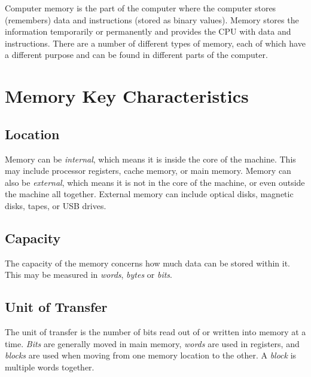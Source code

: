 
Computer memory is the part of the computer where the computer stores (remembers) data and instructions (stored as binary values). Memory stores the information temporarily or permanently and provides the CPU with data and instructions. There are a number of different types of memory, each of which have a different purpose and can be found in different parts of the computer.

\section*{Memory Key Characteristics}
\subsection*{Location}
Memory can be \textit{internal}, which means it is inside the core of the machine. This may include processor registers, cache memory, or main memory. Memory can also be \textit{external}, which means it is not in the core of the machine, or even outside the machine all together. External memory can include optical disks, magnetic disks, tapes, or USB drives.
\subsection*{Capacity}
The capacity of the memory concerns how much data can be stored within it. This may be measured in \textit{words}, \textit{bytes} or \textit{bits}.
\subsection*{Unit of Transfer}
The unit of transfer is the number of bits read out of or written into memory at a time. \textit{Bits} are generally moved in main memory, \textit{words} are used in registers, and \textit{blocks} are used when moving from one memory location to the other. A \textit{block} is multiple words together. 
